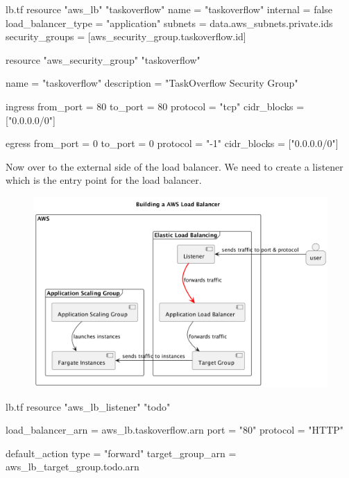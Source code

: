 \documentclass{csse4400}
\begin{document}
\begin{code}[language=terraform,numbers=none,keepspaces=true]{lb.tf}
resource "aws_lb" "taskoverflow" {
  name               = "taskoverflow"
  internal           = false
  load_balancer_type = "application"
  subnets            = data.aws_subnets.private.ids
  security_groups    = [aws_security_group.taskoverflow.id]
}

resource "aws_security_group" "taskoverflow" {
  name        = "taskoverflow"
  description = "TaskOverflow Security Group"

  ingress {
    from_port     = 80
    to_port       = 80
    protocol      = "tcp"
    cidr_blocks   = ["0.0.0.0/0"]
  }

  egress {
    from_port     = 0
    to_port       = 0
    protocol      = "-1"
    cidr_blocks   = ["0.0.0.0/0"]
  }
}
\end{code}

Now over to the external side of the load balancer.
We need to create a listener which is the entry point for the load balancer.

\begin{figure}[H]
  \begin{center}
    \includegraphics[scale=0.2]{diagrams/lb4fargate}
  \end{center}
\end{figure}

\begin{code}[language=terraform,numbers=none,keepspaces=true]{lb.tf}
resource "aws_lb_listener" "todo" {
  load_balancer_arn   = aws_lb.taskoverflow.arn
  port                = "80"
  protocol            = "HTTP"

  default_action {
    type              = "forward"
    target_group_arn  = aws_lb_target_group.todo.arn
  }
}
\end{code}
\end{document}
